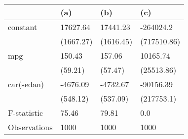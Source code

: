 \begin{tabular}{llll}
\toprule
{} &        (a) &        (b) &          (c) \\
\midrule
constant     &   17627.64 &   17441.23 &    -264024.2 \\
             &  (1667.27) &  (1616.45) &  (717510.86) \\
mpg          &     150.43 &     157.06 &     10165.74 \\
             &    (59.21) &    (57.47) &   (25513.86) \\
car(sedan)   &   -4676.09 &   -4732.67 &    -90156.39 \\
             &   (548.12) &   (537.09) &   (217753.1) \\
F-statistic  &      75.46 &      79.81 &          0.0 \\
Observations &       1000 &       1000 &         1000 \\
\bottomrule
\end{tabular}
